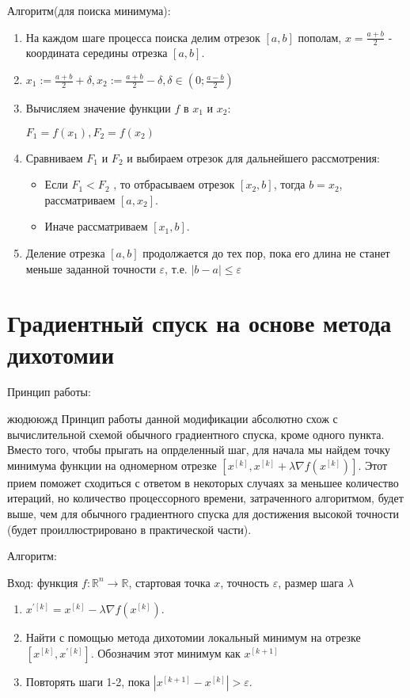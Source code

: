     Алгоритм(для поиска минимума):
    \begin{enumerate}
        \item На каждом шаге процесса поиска делим отрезок $[a,b]$ пополам, $x = \frac{a + b}{2}$ - координата середины отрезка $[a,b]$.
        \item $x_1 := \frac{a + b}{2} + \delta, x_2 := \frac{a + b}{2} - \delta, \delta \in (0; \frac{a - b}{2})$
        \item Вычисляем значение функции $f$ в $x_1$ и $x_2$: 

        $F_1 = f(x_1), F_2 = f(x_2)$

        \item Сравниваем $F_1$ и $F_2$ и выбираем отрезок для дальнейшего рассмотрения:
        \begin{itemize}
            \item Если $F_1 < F_2$ , то отбрасываем отрезок $[x_2,b]$, тогда $b = x_2$, рассматриваем $[a, x_2]$.
            \item Иначе рассматриваем $[x_1, b]$.
        \end{itemize}

        \item Деление отрезка $[a,b]$ продолжается до тех пор, пока его длина не станет меньше заданной точности $\varepsilon$, т.е. $|b - a| \leq\varepsilon$
    \end{enumerate}


\section{Градиентный спуск на основе метода дихотомии}

    Принцип работы:

жюдююжд    Принцип работы данной модификации абсолютно схож с вычислительной схемой обычного градиентного спуска, кроме одного пункта. Вместо того, чтобы прыгать на опрделенный шаг, для начала мы найдем точку минимума функции на одномерном отрезке $[x^{[k]}, x^{[k]} + \lambda\nabla f(x^{[k]})]$. Этот прием поможет сходиться с ответом в некоторых случаях за меньшее количество итераций, но количество процессорного времени, затраченного алгоритмом, будет выше, чем для обычного градиентного спуска для достижения высокой точности (будет проиллюстрировано в практической части).

    Алгоритм:
    
    Вход: функция $f:\mathbb{R}^n \rightarrow \mathbb{R}$, стартовая точка $x$, точность $\varepsilon$, размер шага $\lambda$
    \begin{enumerate}
        \item $x^{'[k]} = x^{[k]} - \lambda\nabla f(x^{[k]})$.
        \item Найти с помощью метода дихотомии локальный минимум на отрезке $[x^{[k]}, x^{'[k]}]$. Обозначим этот минимум как $x^{[k + 1]}$
        \item Повторять шаги 1-2, пока  $|x^{[k+1]} - x^{[k]}| > \varepsilon$.
    \end{enumerate}


